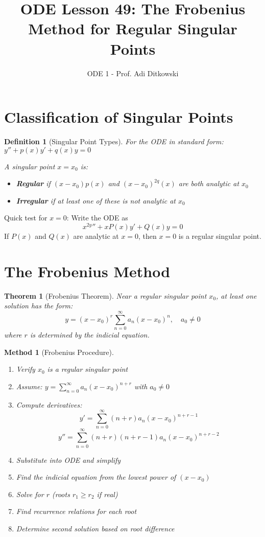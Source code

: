 \documentclass[12pt]{article}
\title{ODE Lesson 49: The Frobenius Method for Regular Singular Points}
\author{ODE 1 - Prof. Adi Ditkowski}
\date{}
\newtheorem{definition}{Definition}
\newtheorem{theorem}{Theorem}
\newtheorem{method}{Method}
\begin{document}
\maketitle

\section{Classification of Singular Points}

\begin{definition}[Singular Point Types]
For the ODE in standard form: $y'' + p(x)y' + q(x)y = 0$

A singular point $x = x_{0}$ is:
\begin{itemize}
\item \textbf{Regular} if $(x-x_{0})p(x)$ and $(x-x_{0})^{2q}(x)$ are both analytic at $x_{0}$
\item \textbf{Irregular} if at least one of these is not analytic at $x_{0}$
\end{itemize}
\end{definition}

\begin{keypoint}
Quick test for $x = 0$: Write the ODE as
$$x^{2y}'' + xP(x)y' + Q(x)y = 0$$
If $P(x)$ and $Q(x)$ are analytic at $x = 0$, then $x = 0$ is a regular singular point.
\end{keypoint}

\section{The Frobenius Method}

\begin{theorem}[Frobenius Theorem]
Near a regular singular point $x_{0}$, at least one solution has the form:
$$y = (x-x_{0})^{r} \sum_{n=0}^{\infty} a_{n}(x-x_{0})^{n}, \quad a_{0} \neq 0$$
where $r$ is determined by the indicial equation.
\end{theorem}

\begin{method}[Frobenius Procedure]
\begin{enumerate}
\item Verify $x_{0}$ is a regular singular point
\item Assume: $y = \sum_{n=0}^{\infty} a_{n}(x-x_{0})^{n+r}$ with $a_{0} \neq 0$
\item Compute derivatives:
$$y' = \sum_{n=0}^{\infty} (n+r)a_{n}(x-x_{0})^{n+r-1}$$
$$y'' = \sum_{n=0}^{\infty} (n+r)(n+r-1)a_{n}(x-x_{0})^{n+r-2}$$
\item Substitute into ODE and simplify
\item Find the indicial equation from the lowest power of $(x-x_{0})$
\item Solve for $r$ (roots $r_{1} \geq r_{2}$ if real)
\item Find recurrence relations for each root
\item Determine second solution based on root difference
\end{enumerate}
\end{method}
\end{document}
